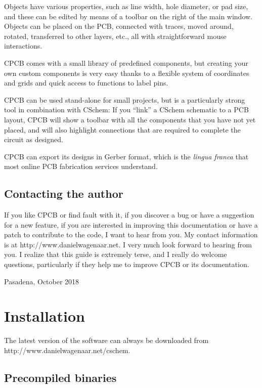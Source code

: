 \documentclass[11pt]{report}
\begin{document}
Objects have various properties, such as line width, hole diameter, or
pad size, and these can be edited by means of a toolbar on the right
of the main window. Objects can be placed on the PCB, connected with
traces, moved around, rotated, transferred to other layers, etc., all
with straightforward mouse interactions.

CPCB comes with a small library of predefined components, but creating
your own custom components is very easy thanks to a flexible system of
coordinates and grids and quick access to functions to label pins.

CPCB can be used stand-alone for small projects, but is a particularly
strong tool in combination with CSchem: If you ``link'' a CSchem
schematic to a PCB layout, CPCB will show a toolbar with all the
components that you have not yet placed, and will also highlight
connections that are required to complete the circuit as designed.

CPCB can export its designs in Gerber format, which is the
\emph{lingua franca} that most online PCB fabrication services
understand.

\section{Contacting the author}

If you like CPCB or find fault with it, if you discover a bug or have a
suggestion for a new feature, if you are interested in improving this
documentation or have a patch to contribute to the code, I want to
hear from you. My contact information is at
http://www.danielwagenaar.net. I very much look forward to hearing
from you. I realize that this guide is extremely terse, and I
really do welcome questions, particularly if they help me to improve
CPCB or its documentation.\bigskip

\noindent Pasadena, October 2018

\chapter{Installation}\label{ch.install}

The latest version of the software can always be downloaded from\break
http://www.danielwagenaar.net/cschem.

\section{Precompiled binaries}
\end{document}
